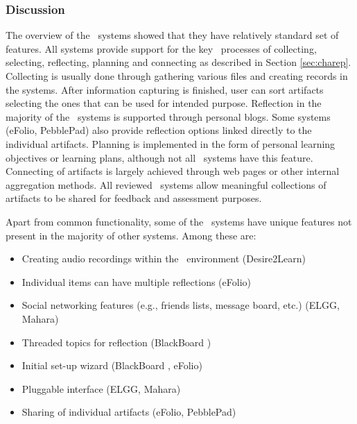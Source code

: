 \subsubsection{Discussion}
The overview of the \ep~systems showed that they have relatively standard set of
features. All systems provide support for the key \ep~processes of collecting,
selecting, reflecting, planning and connecting as described in Section
\ref{sec:charep}. Collecting is usually done through gathering various files and
creating records in the systems. After information capturing is finished, user
can sort artifacts selecting the ones that can be used for intended purpose.
Reflection in the majority of the \ep~systems is supported through personal
blogs. Some systems (eFolio, PebblePad) also provide reflection options linked
directly to the individual artifacts. Planning is implemented in the form of
personal learning objectives or learning plans, although not all \ep~systems
have this feature. Connecting of artifacts is largely achieved through web pages
or other internal aggregation methods. All reviewed \ep~systems allow meaningful
collections of artifacts to be shared for feedback and assessment purposes.

Apart from common functionality, some of the \ep~systems have unique features
not present in the majority of other systems. Among these are:
\begin{itemize}
  \item Creating audio recordings within the \ep~environment (Desire2Learn)
  \item Individual items can have multiple reflections (eFolio)
  \item Social networking features (e.g., friends lists, message board, etc.)
  (ELGG, Mahara)
  \item Threaded topics for reflection (BlackBoard \ep)
  \item Initial set-up wizard (BlackBoard \ep, eFolio)
  \item Pluggable interface (ELGG, Mahara)
  \item Sharing of individual artifacts (eFolio, PebblePad)
\end{itemize}

